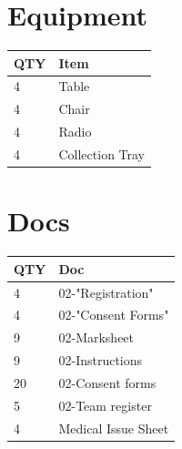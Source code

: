 \documentclass[10pt, A5]{article}
\begin{document}
\begin{framed}
\begin{minipage}{\textwidth}
\begin{multicols}{2}
		\section*{\faWrench \: Equipment}

		
	\begin{center}
			\begin{tabular}{p{2cm}p{4cm}}


				\textbf{QTY} & \textbf{Item} \\\toprule
												4&Table\\\midrule
												4&Chair\\\midrule
												4&Radio\\\midrule
												4&Collection Tray\\\midrule
								\end{tabular}

			\end{center}

		
		\vfill\null
		\columnbreak

			\section*{\faFile \: Docs}
		 	\begin{center}
			\begin{tabular}{p{2cm}p{4cm}}

			\textbf{QTY} & \textbf{Doc} \\\toprule
										4&02-"Registration"\\\midrule
										4&02-"Consent Forms"\\\midrule
										9&02-Marksheet\\\midrule
										9&02-Instructions\\\midrule
										20&02-Consent forms\\\midrule
										5&02-Team register\\\midrule
										4&Medical Issue Sheet\\\midrule
							\end{tabular}
			\end{center}
	

		\vfill\null

		\end{multicols}
\end{minipage}
\end{framed}
\end{document}
